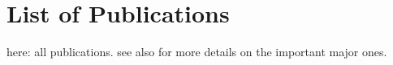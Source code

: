 
\cleardoublepage

\chapter{List of Publications}
\label{ch:Publications}

here: all publications.
see also  for more details on the important major ones.


